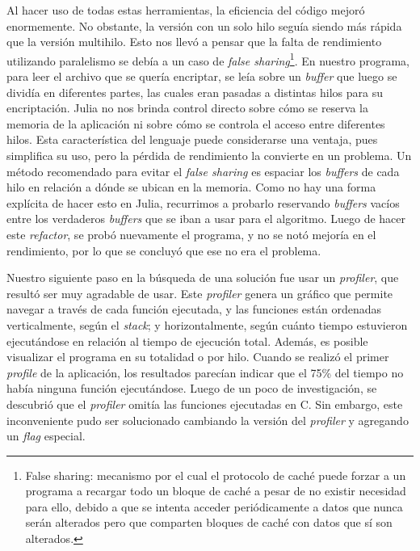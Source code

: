 \documentclass[11pt]{article}
\newcommand{\english}[1]{\textit{#1}}
\begin{document}
Al hacer uso de todas estas herramientas, la eficiencia del código mejoró enormemente. No obstante, la versión con un solo hilo seguía siendo más rápida que la versión multihilo. Esto nos llevó a pensar que la falta de rendimiento utilizando paralelismo se debía a un caso de \english{false sharing}\footnote{False sharing: mecanismo por el cual el protocolo de caché puede forzar a un programa a recargar todo un bloque de caché a pesar de no existir necesidad para ello, debido a que se intenta acceder periódicamente a datos que nunca serán alterados pero que comparten bloques de caché con datos que sí son alterados.}. En nuestro programa, para leer el archivo que se quería encriptar, se leía sobre un \english{buffer} que luego se dividía en diferentes partes, las cuales eran pasadas a distintas hilos para su encriptación. Julia no nos brinda control directo sobre cómo se reserva la memoria de la aplicación ni sobre cómo se controla el acceso entre diferentes hilos. Esta característica del lenguaje puede considerarse una ventaja, pues simplifica su uso, pero la pérdida de rendimiento la convierte en un problema. Un método recomendado para evitar el \english{false sharing} es espaciar los \english{buffers} de cada hilo en relación a dónde se ubican en la memoria. Como no hay una forma explícita de hacer esto en Julia, recurrimos a probarlo reservando \english{buffers} vacíos entre los verdaderos \english{buffers} que se iban a usar para el algoritmo. Luego de hacer este \english{refactor}, se probó nuevamente el programa, y no se notó mejoría en el rendimiento, por lo que se concluyó que ese no era el problema.

Nuestro siguiente paso en la búsqueda de una solución fue usar un \english{profiler}, que resultó ser muy agradable de usar. Este \english{profiler} genera un gráfico que permite navegar a través de cada función ejecutada, y las funciones están ordenadas verticalmente, según el \english{stack}; y horizontalmente, según cuánto tiempo estuvieron ejecutándose en relación al tiempo de ejecución total. Además, es posible visualizar el programa en su totalidad o por hilo. Cuando se realizó el primer \english{profile} de la aplicación, los resultados parecían indicar que el 75\% del tiempo no había ninguna función ejecutándose. Luego de un poco de investigación, se descubrió que el \english{profiler} omitía las funciones ejecutadas en C. Sin embargo, este inconveniente pudo ser solucionado cambiando la versión del \english{profiler} y agregando un \english{flag} especial.
\end{document}
